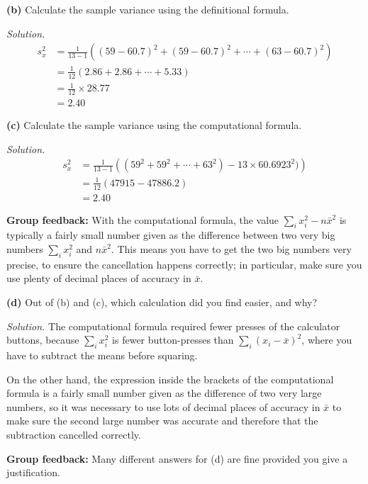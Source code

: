 \documentclass[
  a4paper,
]{book}
\theoremstyle{definition}
\theoremstyle{definition}
\theoremstyle{definition}
\theoremstyle{definition}
\theoremstyle{remark}
\begin{document}
\textbf{(b)} Calculate the sample variance using the definitional
formula.

\begin{myanswers}
\emph{Solution.}
\begin{align*}
s_x^2 &= \frac{1}{13 - 1} \left( (59 - 60.7)^2 + (59 - 60.7)^2 + \cdots + (63 - 60.7)^2 \right) \\
      &= \frac{1}{12} (2.86 + 2.86 + \cdots + 5.33) \\
      &= \frac{1}{12} \times 28.77 \\
      &= 2.40
\end{align*}

\end{myanswers}

\textbf{(c)} Calculate the sample variance using the computational formula.

\begin{myanswers}
\emph{Solution.}
\begin{align*}
s_x^2 &= \frac{1}{13 - 1} \left( (59^2 + 59^2 + \cdots + 63^2) - 13 \times 60.6923^2)\right) \\
      &= \frac{1}{12} (47915 - 47886.2) \\
      &= 2.40
\end{align*}

\textbf{Group feedback:} With the computational formula, the value \(\sum_i x_i^2 - n \bar{x}^2\) is typically a fairly small number given as the difference between two very big numbers \(\sum_i x_i^2\) and \(n \bar x^2\). This means you have to get the two big numbers very precise, to ensure the cancellation happens correctly; in particular, make sure you use plenty of decimal places of accuracy in \(\bar x\).

\end{myanswers}

\textbf{(d)} Out of (b) and (c), which calculation did you find easier, and why?

\begin{myanswers}
\emph{Solution.} The computational formula required fewer presses of the calculator buttons, because \(\sum_i x_i^2\) is fewer button-presses than \(\sum_i (x_i - \bar x)^2\), where you have to subtract the means before squaring.

On the other hand, the expression inside the brackets of the computational formula is a fairly small number given as the difference of two very large numbers, so it was necessary to use lots of decimal places of accuracy in \(\bar x\) to make sure the second large number was accurate and therefore that the subtraction cancelled correctly.

\textbf{Group feedback:} Many different answers for (d) are fine provided you give a justification.

\end{myanswers}
\end{document}
